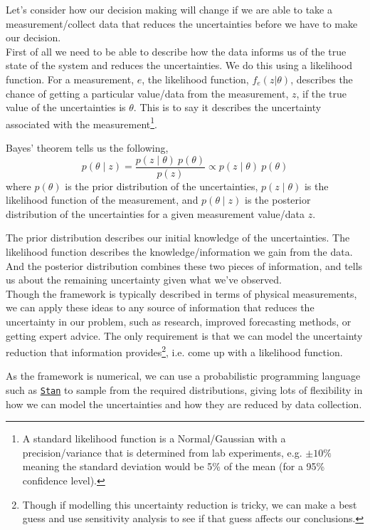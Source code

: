 Let's consider how our decision making will change if we are able to take a measurement/collect data that reduces the uncertainties before we have to make our decision.\\

First of all we need to be able to describe how the data informs us of the true state of the system and reduces the uncertainties. We do this using a likelihood function. For a measurement, $e$, the likelihood function, $f_e(z|\theta)$, describes the chance of getting a particular value/data from the measurement, $z$, if the true value of the uncertainties is $\theta$. This is to say it describes the uncertainty associated with the measurement\footnote{A standard likelihood function is a Normal/Gaussian with a precision/variance that is determined from lab experiments, e.g. $\pm10\%$ meaning the standard deviation would be 5\% of the mean (for a 95\% confidence level).}.

Bayes' theorem tells us the following,
\begin{equation}
    p(\theta \mid z) = \frac{p(z \mid \theta) \: p(\theta)}{p(z)} \propto p(z \mid \theta) \: p(\theta)
\end{equation}
where $p(\theta)$ is the prior distribution of the uncertainties, $p(z \mid \theta)$ is the likelihood function of the measurement, and $p(\theta \mid z)$ is the posterior distribution of the uncertainties for a given measurement value/data $z$.

The prior distribution describes our initial knowledge of the uncertainties. The likelihood function describes the knowledge/information we gain from the data. And the posterior distribution combines these two pieces of information, and tells us about the remaining uncertainty given what we've observed. \\

Though the framework is typically described in terms of physical measurements, we can apply these ideas to any source of information that reduces the uncertainty in our problem, such as research, improved forecasting methods, or getting expert advice. The only requirement is that we can model the uncertainty reduction that information provides\footnote{Though if modelling this uncertainty reduction is tricky, we can make a best guess and use sensitivity analysis to see if that guess affects our conclusions.}, i.e. come up with a likelihood function.

As the  framework is numerical, we can use a probabilistic programming language such as \href{https://mc-stan.org/}{\texttt{Stan}} \citep{carpenter2017StanProbabilisticProgramming} to sample from the required distributions, giving lots of flexibility in how we can model the uncertainties and how they are reduced by data collection.\\

